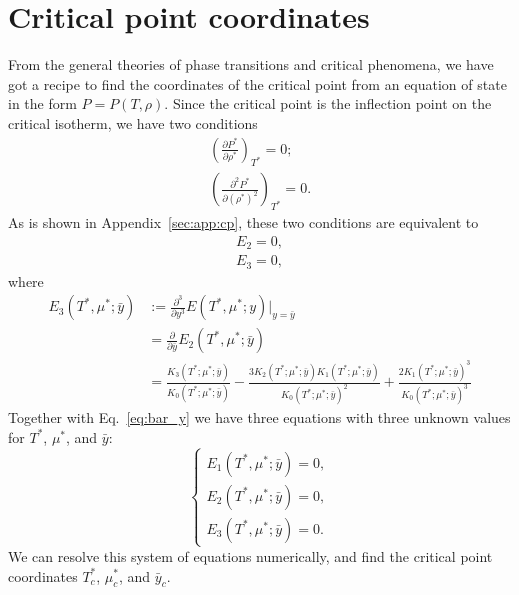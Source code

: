 \documentclass[12pt]{article}
\numberwithin{equation}{section}
\begin{document}
	\section{\label{sec:CP} Critical point coordinates}
	From the general theories of phase transitions and critical phenomena, we have got a recipe to find the coordinates of the critical point from an equation of state in the form $P=P(T,\rho)$. Since the critical point is the inflection point on the critical isotherm, we have two conditions
	\begin{equation}
		\begin{split}
			\left(\frac{\partial P^*}{\partial \rho^*}\right)_{T^*} = 0;
			\\
			\left(\frac{\partial^2 P^*}{\partial (\rho^*)^2}\right)_{T^*} = 0.
		\end{split}		
	\end{equation}
	As is shown in Appendix~\ref{sec:app:cp}, these two conditions are equivalent to
	\begin{equation}
		\begin{split}
			E_2 = 0,
			\\
			E_3 = 0,
		\end{split}
	\end{equation}
	where
	\begin{equation}
		\begin{split}
			E_3(T^*,\mu^*;\bar{y}) &:= \frac{\partial^3}{\partial y^3} E(T^*,\mu^*; y)\big|_{y=\bar{y}} 
			\\
			& = \frac{\partial}{\partial \bar{y}} E_2(T^*,\mu^*; \bar{y})
			\\
			& = \frac{K_3(T^*;\mu^*;\bar{y})}{K_0(T^*;\mu^*;\bar{y})} - \frac{3 K_2(T^*;\mu^*;\bar{y}) K_1(T^*;\mu^*;\bar{y})}{K_0(T^*;\mu^*;\bar{y})^2} + \frac{2K_1(T^*;\mu^*;\bar{y})^3}{K_0(T^*;\mu^*;\bar{y})^3}
		\end{split}
	\end{equation}
	Together with Eq.~\eqref{eq:bar_y} we have three equations with three unknown values for $T^*$, $\mu^*$, and $\bar{y}$:
	\begin{equation}
		\label{eq:system}
		\begin{cases}
			E_1(T^*,\mu^*; \bar{y}) = 0,\\
			E_2(T^*,\mu^*; \bar{y}) = 0,\\
			E_3(T^*,\mu^*; \bar{y}) = 0.
		\end{cases}
	\end{equation}
	We can resolve this system of equations numerically, and find the critical point coordinates $T^*_c$, $\mu^*_c$, and $\bar{y}_c$.
	
\end{document}
